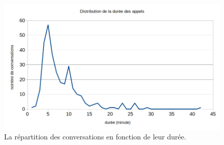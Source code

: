 \begin{figure}
  \centering
  \includegraphics[width=15cm]{./Chapitre4/figures/repart.png}
  \caption{La répartition des conversations en fonction de leur durée.}
  \label{fig:repart}
\end{figure}
